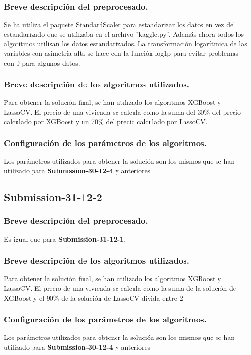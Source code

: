 	\subsubsection{Breve descripción del preprocesado.}
	Se ha utiliza el paquete StandardScaler para estandarizar los datos en vez del estandarizado que se utilizaba en el archivo ``kaggle.py``. Además ahora todos los algoritmos utilizan los datos estandarizados. La transformación logarítmica de las variables con asimetría alta se hace con la función log1p para evitar problemas con 0 para algunos datos.
	\subsubsection{Breve descripción de los algoritmos utilizados.}
	Para obtener la solución final, se han utilizado los algoritmos XGBoost y LassoCV. El precio de una vivienda se calcula como la suma del 30\% del precio calculado por XGBoost y un 70\% del precio calculado por LassoCV.
	\subsubsection{Configuración de los parámetros de los algoritmos.}
	Los parámetros utilizados para obtener la solución son los mismos que se han utilizado para \textbf{Submission-30-12-4} y anteriores.
	
	
	\subsection{Submission-31-12-2}
	\subsubsection{Breve descripción del preprocesado.}
	Es igual que para \textbf{Submission-31-12-1}.
	\subsubsection{Breve descripción de los algoritmos utilizados.}
	Para obtener la solución final, se han utilizado los algoritmos XGBoost y LassoCV. El precio de una vivienda se calcula como la suma de la solución de XGBoost y el 90\% de la solución de LassoCV divida entre 2.
	\subsubsection{Configuración de los parámetros de los algoritmos.}
	Los parámetros utilizados para obtener la solución son los mismos que se han utilizado para \textbf{Submission-30-12-4} y anteriores.
	
